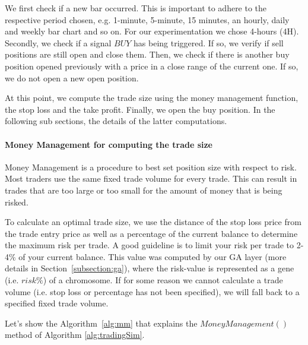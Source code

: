 We first check if a new bar occurred. This is important to adhere to the respective period chosen, e.g. 1-minute,  5-minute, 15 minutes, an hourly, daily and weekly bar chart and so on. For our experimentation we chose 4-hours (4H).
Secondly, we check if a signal $BUY$ has being triggered. If so, we verify if sell positions are still open and close them. Then, we check if there is another buy position opened previously with a price in a close range of the current one. If so, we do not open a new open position.

\noindent At this point, we compute the trade size using the money management function, the stop loss and the take profit. Finally, we open the buy position. In the following sub sections, the details of the latter computations. 

\paragraph{\textbf{Money Management for computing the trade size}}\mbox{}

Money Management is a procedure to best set position size with respect to risk. Most traders use the same fixed trade volume for every trade. This can result in trades that are too large or too small for the amount of money that is being risked.

To calculate an optimal trade size, we use the distance of the stop loss price from the trade entry price as well as a percentage of the current balance to determine the maximum risk per trade. A good guideline is to limit your risk per trade to 2-4\% of your current balance. This value was computed by our GA layer (more details in Section~\ref{subsection:ga}), where the risk-value is represented as a gene (i.e. $risk\%$) of a chromosome. If for some reason we cannot calculate a trade volume (i.e. stop loss or percentage has not been specified), we will fall back to a specified fixed trade volume.

Let's show the Algorithm~\ref{alg:mm} that explains the $MoneyManagement()$ method of Algorithm \ref{alg:tradingSim}. 

